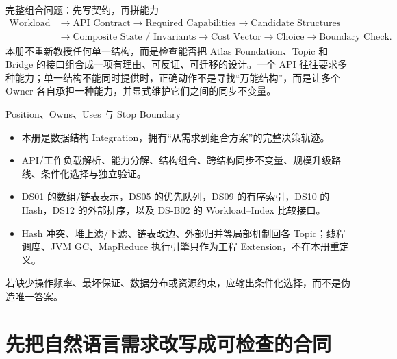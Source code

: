 \documentclass[UTF8,fontset=none,11pt,a4paper]{ctexart}
\begin{document}

\begin{corebox}{完整组合问题：先写契约，再拼能力}
\[
\boxed{
\begin{aligned}
\text{Workload}
&\to \text{API Contract}
\to \text{Required Capabilities}
\to \text{Candidate Structures}\\
&\to \text{Composite State / Invariants}
\to \text{Cost Vector}
\to \text{Choice}
\to \text{Boundary Check}.
\end{aligned}}
\]
本册不重新教授任何单一结构，而是检查能否把 Atlas Foundation、Topic 和 Bridge 的接口组合成一项有理由、可反证、可迁移的设计。一个 API 往往要求多种能力；单一结构不能同时提供时，正确动作不是寻找“万能结构”，而是让多个 Owner 各自承担一种能力，并显式维护它们之间的同步不变量。
\end{corebox}

\begin{methodbox}{Position、Owns、Uses 与 Stop Boundary}
\begin{itemize}
  \item {}本册是数据结构 Integration，拥有“从需求到组合方案”的完整决策轨迹。
  \item {}API/工作负载解析、能力分解、结构组合、跨结构同步不变量、规模升级路线、条件化选择与独立验证。
  \item {}DS01 的数组/链表表示，DS05 的优先队列，DS09 的有序索引，DS10 的 Hash，DS12 的外部排序，以及 DS-B02 的 Workload--Index 比较接口。
  \item {}Hash 冲突、堆上滤/下滤、链表改边、外部归并等局部机制回各 Topic；线程调度、JVM GC、MapReduce 执行引擎只作为工程 Extension，不在本册重定义。
\end{itemize}
若缺少操作频率、最坏保证、数据分布或资源约束，应输出条件化选择，而不是伪造唯一答案。
\end{methodbox}

\tableofcontents
\newpage

\section{先把自然语言需求改写成可检查的合同}
\end{document}
